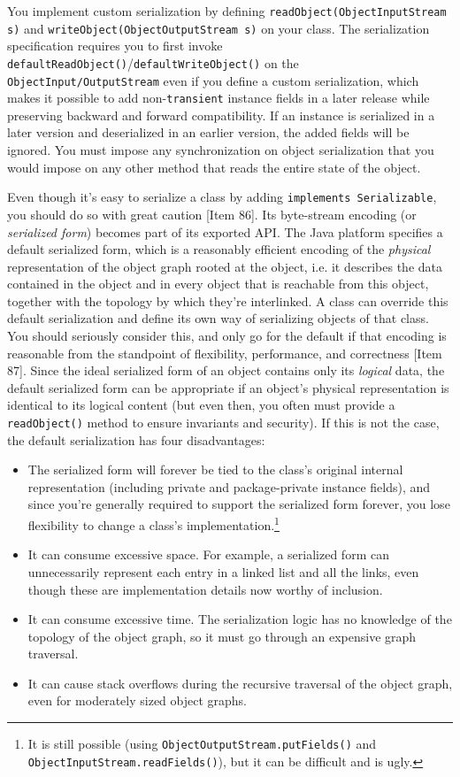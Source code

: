 \documentclass[8pt, table, xcdraw]{article}%
\begin{document}
You implement custom serialization by defining \lstinline{readObject(ObjectInputStream s)} and \lstinline{writeObject(ObjectOutputStream s)} on your class. The serialization specification requires you to first invoke
\lstinline{defaultReadObject()}/\lstinline{defaultWriteObject()} on the \lstinline{ObjectInput/OutputStream} even if you define a custom serialization, which makes it possible to add non-\lstinline{transient} instance fields in a later release while preserving backward and forward compatibility. If an instance is serialized in a later version and deserialized in an earlier version, the added fields will be ignored. You must impose any synchronization on object serialization that you would impose on any other method that reads the entire state of the object.

Even though it's easy to serialize a class by adding \lstinline{implements Serializable}, you should do so with great caution [Item 86]. Its byte-stream encoding (or \emph{serialized form}) becomes part of its exported API. The Java platform specifies a default serialized form, which is a reasonably efficient encoding of the \emph{physical} representation of the object graph rooted at the object, i.e. it describes the data contained in the object and in every object that is reachable from this object, together with the topology by which they're interlinked. A class can override this default serialization and define its own way of serializing objects of that class. You should seriously consider this, and only go for the default if that encoding is reasonable from the standpoint of flexibility, performance, and correctness [Item 87]. Since the ideal serialized form of an object contains only its \emph{logical} data, the default serialized form can be appropriate if an object’s physical representation is identical to its logical content (but even then, you often must provide a \lstinline{readObject()} method to ensure invariants and security). If this is not the case, the default serialization has four disadvantages:

\begin{itemize}
    \item The serialized form will forever be tied to the class’s original internal representation (including private and package-private instance fields), and since you're generally required to support the serialized form forever, you lose flexibility to change a class’s implementation.\footnote{It is still possible (using \lstinline{ObjectOutputStream.putFields()} and \lstinline{ObjectInputStream.readFields()}), but it can be difficult and is ugly.}
    \item It can consume excessive space. For example, a serialized form can unnecessarily represent each entry in a linked list and all the links, even though these are implementation details now worthy of inclusion.
    \item It can consume excessive time. The serialization logic has no knowledge of the topology of the object graph, so it must go through an expensive graph traversal.
    \item It can cause stack overflows during the recursive traversal of the object graph, even for moderately sized object graphs.
\end{itemize}
\end{document}
